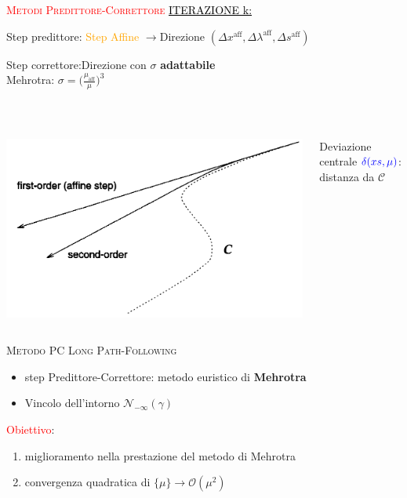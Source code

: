 \begin{frame}{\textsc{\LARGE \textcolor{red}{Metodi Predittore-Correttore}}}
\pause
\textcolor{black}{\underline{ITERAZIONE k:}}
\pause
{}
\setcounter{elenco}{0}
\begin{list}{}{\setlength{\itemsep}{0.6cm}}
	\item Step predittore: \textcolor{orange}{Step Affine} $\rightarrow$\pause Direzione $(\Delta x^{\text{aff}}, \Delta \lambda^{\text{aff}},\Delta s^{\text{aff}})$
	\pause
	\item Step correttore:\pause \;\;Direzione con $\sigma$ \textbf{adattabile}\pause \\[0.6cm]
	
	\;\;\;\;\;\;\;\;\;\;\;\;\;\;\;\;\;\;\;\;\;\;\;\;\;Mehrotra: $\sigma = \big(\frac{\mu_{\text{aff}}}{\mu}\big)^{3}$
	
	\end{list}
\\[1 cm]
\pause
\begin{columns}
	\begin{column}{0.4\textwidth}
	\includegraphics[width=\columnwidth]{MEH.PNG}
\end{column}
\begin{column}{0.4\textwidth}
	Deviazione centrale $\textcolor{blue}{\delta(xs, \mu)}$: distanza da $\mathcal{C}$
\end{column}
\end{columns}
\end{frame}


\begin{frame}[t]{\textsc{\LARGE \textcolor{sapphire}{Metodo PC Long Path-Following}}}
\begin{itemize}
\item step Predittore-Correttore: metodo euristico di \textbf{Mehrotra}
\item Vincolo dell'intorno $\mathcal{N}_{-\infty}(\gamma)$
\end{itemize}
\pause
\textcolor{red}{Obiettivo}: 
\begin{enumerate}
	\item miglioramento nella prestazione del metodo di Mehrotra
	\item convergenza quadratica di $\{\mu\}\rightarrow \mathcal{O}(\mu^{2})$
\end{enumerate}
\end{frame}

